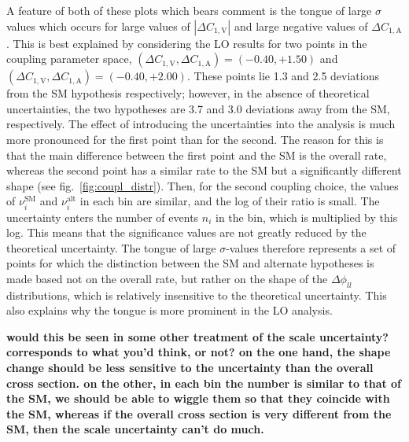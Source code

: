 \documentclass[preprint]{JHEP3}
\newcommand{\SM}{\mathrm{SM}}
\newcommand{\alt}{\mathrm{alt}}
\def\Dphill{\Delta \phi_{ll}}
\def\DConeA{\Delta C_{1,\mathrm{A}}}
\def\DConeV{\Delta C_{1,\mathrm{V}}}
\begin{document}
A feature of both of these plots which bears comment is the tongue of large $\sigma$ values which occurs for large values of $| \DConeV|$ and large 
negative values of $\DConeA$. This is best explained by considering the LO results for two points in the coupling parameter space, 
$(\DConeV,\DConeA)=(-0.40,+1.50)$ and $(\DConeV,\DConeA)=(-0.40,+2.00)$. These points lie 1.3 and 2.5 deviations from the SM hypothesis respectively; 
however, in the absence of theoretical uncertainties, the two hypotheses are 3.7 and 3.0 deviations away from the SM, respectively. 
The effect of introducing the uncertainties into the analysis is much more pronounced for the first point than for the second. 
The reason for this is that the main difference between the first point and the SM is the overall rate, whereas the second point has a similar rate to the 
SM but a significantly different shape (see fig.~\ref{fig:coupl_distr}). Then, for the second coupling choice, the values of $\nu_i^{\SM}$ and $\nu_i^{\alt}$ 
in each bin are similar, and the 
log of their ratio is small. The uncertainty enters the number of events $n_i$ in the bin, which is multiplied by this log. 
This means that the significance values are not greatly reduced by the theoretical uncertainty. 
The tongue of large $\sigma$-values therefore represents a set of points for which the distinction between the SM and alternate hypotheses 
is made based not on the overall rate, but rather on the shape of the $\Dphill$ distributions, which is relatively insensitive to the theoretical uncertainty. 
This also explains why the tongue is more prominent in the LO analysis.

{\bf would this be seen in some other treatment of the scale uncertainty? corresponds to what you'd think, or not? on the one hand, 
the shape change should be less sensitive to the uncertainty than the overall cross section. on the other, in each bin the number is similar to that of the SM, 
we should be able to wiggle them so that they coincide with the SM, whereas if the overall cross section is very different from the SM, 
then the scale uncertainty can't do much. } 
\end{document}
